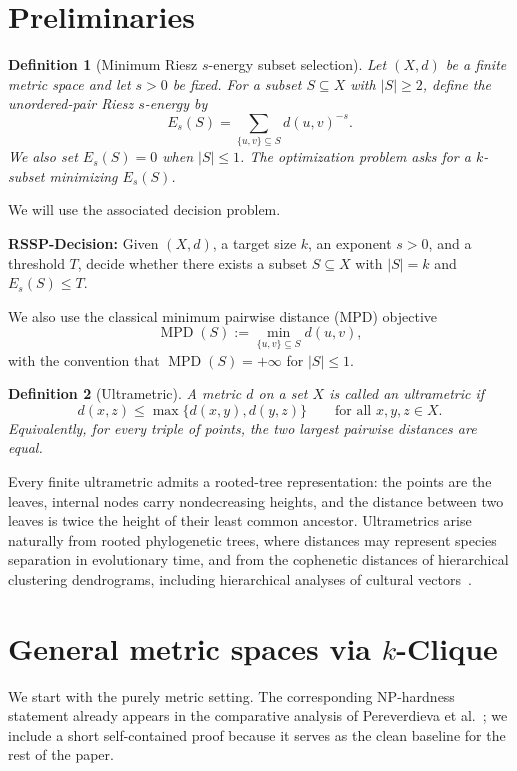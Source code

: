 \documentclass[11pt]{article}
\newtheorem{definition}{Definition}
\newcommand{\Es}[2]{E_{#1}\!\left(#2\right)}
\newcommand{\MM}[1]{\operatorname{MPD}\!\left(#1\right)}
\begin{document}
\section{Preliminaries}

\begin{definition}[Minimum Riesz $s$-energy subset selection]
Let $(X,d)$ be a finite metric space and let $s>0$ be fixed. For a subset $S\subseteq X$ with $|S|\ge 2$, define the unordered-pair Riesz $s$-energy by
\[
\Es{s}{S}=\sum_{\{u,v\}\subseteq S} d(u,v)^{-s}.
\]
We also set $E_s(S)=0$ when $|S|\le 1$. The optimization problem asks for a $k$-subset minimizing $E_s(S)$.
\end{definition}

We will use the associated decision problem.

\medskip
\noindent
\textbf{RSSP-Decision:} Given $(X,d)$, a target size $k$, an exponent $s>0$, and a threshold $T$, decide whether there exists a subset $S\subseteq X$ with $|S|=k$ and $E_s(S)\le T$.

\medskip
We also use the classical minimum pairwise distance (MPD) objective
\[
\MM{S}:=\min_{\{u,v\}\subseteq S} d(u,v),
\]
with the convention that $\MM{S}=+\infty$ for $|S|\le 1$.

\begin{definition}[Ultrametric]
A metric $d$ on a set $X$ is called an \emph{ultrametric} if
\[
d(x,z)\le \max\{d(x,y),d(y,z)\}
\qquad\text{for all }x,y,z\in X.
\]
Equivalently, for every triple of points, the two largest pairwise distances are equal.
\end{definition}

Every finite ultrametric admits a rooted-tree representation: the points are the leaves, internal nodes carry nondecreasing heights, and the distance between two leaves is twice the height of their least common ancestor. Ultrametrics arise naturally from rooted phylogenetic trees, where distances may represent species separation in evolutionary time, and from the cophenetic distances of hierarchical clustering dendrograms, including hierarchical analyses of cultural vectors~\cite{HartmannSteel2006,StivalaEtAl2014}.

\section{General metric spaces via \texorpdfstring{$k$-Clique}{k-Clique}}

We start with the purely metric setting. The corresponding NP-hardness statement already appears in the comparative analysis of Pereverdieva et al.~\cite{PereverdievaEtAl2025}; we include a short self-contained proof because it serves as the clean baseline for the rest of the paper.
\end{document}
